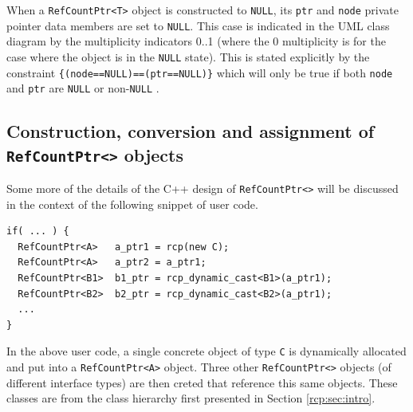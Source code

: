 When a {}\texttt{Ref\-Count\-Ptr<T>} object is constructed to
{}\texttt{NULL}, its {}\texttt{ptr} and {}\texttt{node} private
pointer data members are set to {}\texttt{NULL}.  This case is
indicated in the UML class diagram by the multiplicity indicators 0..1
(where the 0 multiplicity is for the case where the object is in the
{}\texttt{NULL} state).  This is stated explicitly by the constraint
{}\texttt{\{(node==NULL)==(ptr==NULL)\}} which will only be true if
both {}\texttt{node} and {}\texttt{ptr} are {}\texttt{NULL} or
non-{}\texttt{NULL} .

%
\subsection{Construction, conversion and assignment of {}\texttt{Ref\-Count\-Ptr<>} objects}
%

Some more of the details of the C++ design of
{}\texttt{Ref\-Count\-Ptr<>} will be discussed in the context of the
following snippet of user code.
%
{\scriptsize\begin{verbatim}
if( ... ) {
  RefCountPtr<A>   a_ptr1 = rcp(new C);
  RefCountPtr<A>   a_ptr2 = a_ptr1;
  RefCountPtr<B1>  b1_ptr = rcp_dynamic_cast<B1>(a_ptr1);
  RefCountPtr<B2>  b2_ptr = rcp_dynamic_cast<B2>(a_ptr1);
  ...
}
\end{verbatim}}
%
{}\noindent{}In the above user code, a single concrete object of type
{}\texttt{C} is dynamically allocated and put into a
{}\texttt{Ref\-Count\-Ptr<A>} object.  Three other
{}\texttt{Ref\-Count\-Ptr<>} objects (of different interface types)
are then creted that reference this same objects.  These classes are
from the class hierarchy first presented in Section
{}\ref{rcp:sec:intro}.

